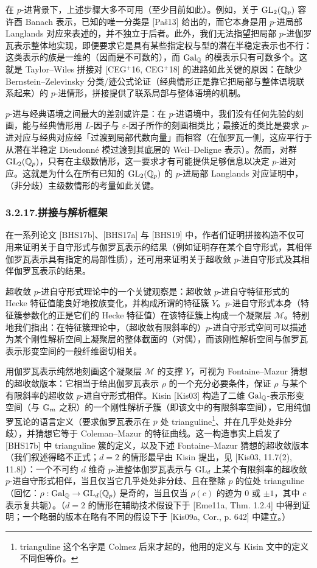 在 $p$-进背景下，上述步骤大多不可用（至少目前如此）。例如，关于 $\mathrm{GL}_2(\mathbb{Q}_p)$ 容许酉 Banach 表示，已知的唯一分类是 [Paš13] 给出的，而它本身是用 $p$-进局部 Langlands 对应来表述的，并不独立于后者。此外，我们无法指望把局部 $p$-进伽罗瓦表示整体地实现，即便要求它是具有某些指定权与型的潜在半稳定表示也不行：这类表示的族是一维的（因而是不可数的），而 $\operatorname{Gal}_{\mathbb{Q}}$ 的模表示只有可数多个。这就是 Taylor--Wiles 拼接对 [CEG$^+$16, CEG$^+$18] 的进路如此关键的原因：在缺少 Bernstein--Zelevinsky 分类/迹公式论证（经典情形正是靠它把局部与整体语境联系起来）的 $p$-进情形，拼接提供了联系局部与整体语境的机制。

$p$-进与经典语境之间最大的差别或许是：在 $p$-进语境中，我们没有任何先验的刻画，能与经典情形用 $L$-因子与 $\varepsilon$-因子所作的刻画相类比；最接近的类比是要求 $p$-进对应与经典对应经「过渡到局部代数向量」而相容（在伽罗瓦一侧，这应平行于从潜在半稳定 Dieudonné 模过渡到其底层的 Weil--Deligne 表示）。然而，对群 $\mathrm{GL}_2(\mathbb{Q}_p)$，只有在主级数情形，这一要求才有可能提供足够信息以决定 $p$-进对应。这就是为什么在所有已知的 $\mathrm{GL}_2(\mathbb{Q}_p)$ 的 $p$-进局部 Langlands 对应证明中，（非分歧）主级数情形的考量如此关键。

\subsubsection*{3.2.17.\quad 拼接与解析框架}

在一系列论文 [BHS17b]、[BHS17a] 与 [BHS19] 中，作者们证明拼接构造不仅可用来证明关于自守形式与伽罗瓦表示的结果（例如证明存在某个自守形式，其相伴伽罗瓦表示具有指定的局部性质），还可用来证明关于超收敛 $p$-进自守形式及其相伴伽罗瓦表示的结果。

超收敛 $p$-进自守形式理论中的一个关键观察是：超收敛 $p$-进自守特征形式的 Hecke 特征值能良好地按族变化，并构成所谓的特征簇 $Y$。$p$-进自守形式本身（特征簇参数化的正是它们的 Hecke 特征值）在该特征簇上构成一个凝聚层 $\mathcal M$。特别地我们指出：在特征簇理论中，（超收敛有限斜率的）$p$-进自守形式空间可以描述为某个刚性解析空间上凝聚层的整体截面的（对偶），而该刚性解析空间与伽罗瓦表示形变空间的一般纤维密切相关。

用伽罗瓦表示纯然地刻画这个凝聚层 $\mathcal M$ 的支撑 $Y$，可视为 Fontaine--Mazur 猜想的超收敛版本：它相当于给出伽罗瓦表示 $\rho$ 的一个充分必要条件，保证 $\rho$ 与某个有限斜率的超收敛 $p$-进自守形式相伴。Kisin [Kis03] 构造了二维 $\operatorname{Gal}_{\mathbb{Q}}$-表示形变空间（与 $\mathbb{G}_m$ 之积）的一个刚性解析子簇（即该文中的有限斜率空间），它用纯伽罗瓦论的语言定义（要求伽罗瓦表示在 $p$ 处 trianguline\footnote{trianguline 这个名字是 Colmez 后来才起的，他用的定义与 Kisin 文中的定义不同但等价。}、并在几乎处处非分歧），并猜想它等于 Coleman--Mazur 的特征曲线。这一构造事实上启发了 [BHS17b] 中 trianguline 簇的定义，以及下述 Fontaine--Mazur 猜想的超收敛版本（我们叙述得略不正式；$d=2$ 的情形最早由 Kisin 提出，见 [Kis03, 11.7(2), 11.8]）：一个不可约 $d$ 维奇 $p$-进整体伽罗瓦表示与 $\mathrm{GL}_d$ 上某个有限斜率的超收敛 $p$-进自守形式相伴，当且仅当它几乎处处非分歧、且在整除 $p$ 的位处 trianguline（回忆：$\rho:\operatorname{Gal}_{\mathbb{Q}}\to\mathrm{GL}_d(\mathbb{Q}_p)$ 是奇的，当且仅当 $\rho(c)$ 的迹为 $0$ 或 $\pm1$，其中 $c$ 表示复共轭）。（$d=2$ 的情形在辅助技术假设下于 [Eme11a, Thm. 1.2.4] 中得到证明；一个略弱的版本在略有不同的假设下于 [Kis09a, Cor., p. 642] 中建立。）

